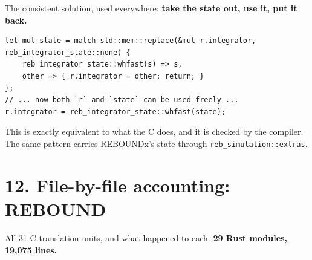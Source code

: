 \documentclass[11pt]{article}
\begin{document}
The consistent solution, used everywhere: \textbf{take the state out, use it, put it back.}

\begin{lstlisting}
let mut state = match std::mem::replace(&mut r.integrator, reb_integrator_state::none) {
    reb_integrator_state::whfast(s) => s,
    other => { r.integrator = other; return; }
};
// ... now both `r` and `state` can be used freely ...
r.integrator = reb_integrator_state::whfast(state);
\end{lstlisting}

This is exactly equivalent to what the C does, and it is checked by the compiler. The same pattern carries REBOUNDx's state through \texttt{reb\_simulation::extras}.

\section{12. File-by-file accounting: REBOUND}

All 31 C translation units, and what happened to each. \textbf{29 Rust modules, 19,075 lines.}
\end{document}
